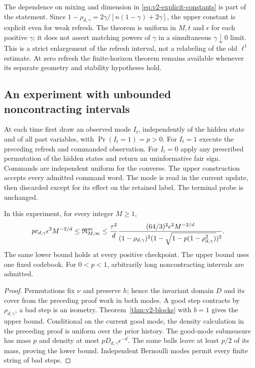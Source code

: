 The dependence on mixing and dimension in
\eqref{eq:v2-explicit-constants} is part of the statement. Since
$1-\rho_{d,\gamma}=2\gamma/[n(1-\gamma)+2\gamma]$, the upper constant
is explicit even for weak refresh. The theorem is uniform in $M,t$ and
$\epsilon$ for each positive $\gamma$; it does not assert matching powers
of $\gamma$ in a simultaneous $\gamma\downarrow0$ limit. This is a
strict enlargement of the refresh interval, not a relabeling of the old
$\ell^1$ estimate. At zero refresh the finite-horizon theorem remains
available whenever its separate geometry and stability hypotheses hold.

\subsection{An experiment with unbounded noncontracting intervals}
At each time first draw an observed mode $I_t$, independently of the
hidden state and of all past variables, with $\Pr(I_t=1)=p>0$.
For $I_t=1$ execute the preceding refresh and commanded observation.
For $I_t=0$ apply any prescribed permutation of the hidden states and
return an uninformative fair sign. Commands are independent uniform for
the converse. The upper construction accepts every admitted command word.
The mode is read in the current update, then discarded except for its
effect on the retained label. The terminal probe is unchanged.

\begin{corollary}
\label{cor:v2-intermittent}
In this experiment, for every integer $M\ge1$,
\[
 p c_{d,\gamma}\epsilon^2M^{-2/d}
 \le\mathfrak R_{M,\infty}^{\rm av}
 \le\frac{\tau^2}{d}
 \frac{(64/3)^2\epsilon^2M^{-2/d}}
 {(1-\rho_{d,\gamma})^2
  (1-\sqrt{1-p(1-\rho_{d,\gamma}^2)})^2}.
\]
The same lower bound holds at every positive checkpoint. The upper bound
uses one fixed codebook. For $0<p<1$, arbitrarily long noncontracting
intervals are admitted.
\end{corollary}
\begin{proof}
Permutations fix $\nu$ and preserve $h$; hence the invariant domain $D$
and its cover from the preceding proof work in both modes. A good step
contracts by $\rho_{d,\gamma}$, a bad step is an isometry.
Theorem~\ref{thm:v2-blocks} with $b=1$ gives the upper bound. Conditional
on the current good mode, the density calculation in the preceding proof
is uniform over the prior history. The good-mode submeasure has mass $p$
and density at most $pD_{d,\gamma}\epsilon^{-d}$. The same balls leave
at least $p/2$ of its mass, proving the lower bound. Independent Bernoulli
modes permit every finite string of bad steps.
\end{proof}


